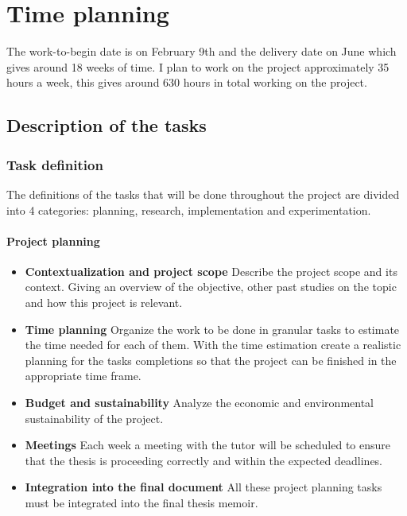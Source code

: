 
\section{Time planning}

The work-to-begin date is on February 9th and the delivery date on June which
gives around 18 weeks of time. I plan to work on the project approximately 35
hours a week, this gives around 630 hours in total working on the project.

\subsection{Description of the tasks}

\subsubsection{Task definition}

The definitions of the tasks that will be done throughout the project are
divided into 4 categories: planning, research, implementation and experimentation.

\paragraph{Project planning}

\begin{itemize}
    \item \textbf{Contextualization and project scope} Describe the project
        scope and its context. Giving an overview of the objective, other past
        studies on the topic and how this project is relevant.
    \item \textbf{Time planning} Organize the work to be done in granular tasks
        to estimate the time needed for each of them. With the time estimation
        create a realistic planning for the tasks completions so that the
        project can be finished in the appropriate time frame.
    \item \textbf{Budget and sustainability} Analyze the economic and
        environmental sustainability of the project.
    \item \textbf{Meetings} Each week a meeting with the tutor will be scheduled
        to ensure that the thesis is proceeding correctly and within the
        expected deadlines.
    \item \textbf{Integration into the final document} All these project
        planning tasks must be integrated into the final thesis memoir.
\end{itemize}

